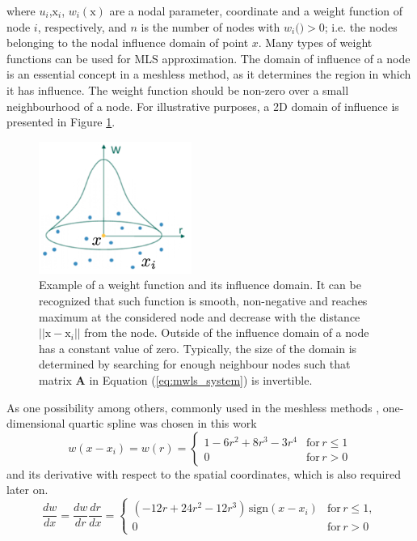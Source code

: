 \documentclass[11pt]{ACMEarticle}
\numberwithin{equation}{section}
\begin{document}
where $u_i$,$\mathrm x_i $, $w_i({\mathrm x})$ are a nodal parameter, coordinate and a weight function of node $i$, respectively, and $n$ is the number of nodes with $w_i(\mathrm) > 0$; i.e. the nodes belonging to the nodal influence domain of point $x$. Many types of weight functions can be used for MLS approximation. The domain of influence of a node is an essential concept in a meshless method, as it determines the region in which it has influence. The weight function should be non-zero over a small neighbourhood of a node. For illustrative purposes, a 2D domain of influence is presented in Figure \ref{fig:weight_func}.
\begin{figure}[h!]
	\begin{centering}
		\includegraphics[width=5cm]{Figures/weight_func}
		\caption{Example of a weight function and its influence domain. It can be recognized that such function is smooth, non-negative and reaches maximum at the considered node and decrease with the distance $|| \mathrm x - \mathrm x_i||$ from the node. Outside of the influence domain of a node has a constant value of zero. Typically, the size of the domain is determined by searching for enough neighbour nodes such that matrix $\mathbf A$ in Equation (\ref{eq:mwls_system}) is invertible.}
		\label{fig:weight_func}
	\end{centering}
\end{figure}
As one possibility among others, commonly used in the meshless methods  \citep{belytschko1996meshless}, one-dimensional quartic spline was chosen in this work
\begin{equation}
w(x-x_i)=w(r)=\begin{cases} 1-6r^2+8r^3-3r^4 & \mathrm{for} \, r \leq 1\\ 0 & \mathrm{for} \, r > 0 \end{cases}
\end{equation}
and its derivative with respect to the spatial coordinates, which is also required later on.
\begin{equation}
\frac{dw}{dx}= \frac{dw}{dr}\frac{dr}{dx} =\begin{cases} (-12r +24r^2 -12 r^3) \, \mathrm{sign} (x-x_i) & \mathrm{for} \, r \leq 1, \\ 0 & \mathrm{for} \, r > 0  \end{cases}
\end{equation}
\end{document}
